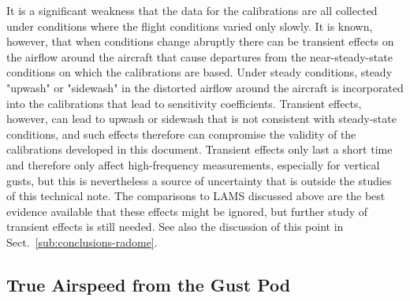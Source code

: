 \documentclass[12pt,twoside,english]{article}\usepackage[]{graphicx}\usepackage[]{color}
\let\OrgIndex\index
\renewcommand*{\index}[1]{\OrgIndex{#1}}
\begin{document}
{{It is a significant weakness that the data for the calibrations are all collected under conditions where the flight conditions varied only slowly. It is known, however, that when conditions change abruptly there can be transient effects on the airflow around the aircraft that cause departures from the near-steady-state conditions on which the calibrations are based. Under steady conditions, steady "upwash" or "sidewash" in the distorted airflow around the aircraft is incorporated into the calibrations that lead to sensitivity coefficients. Transient effects, however, can lead to upwash or sidewash that is not consistent with steady-state conditions, and such effects therefore can compromise the validity of the calibrations developed in this document. Transient effects only last a short time and therefore only affect high-frequency measurements, especially for vertical gusts, but this is nevertheless a source of uncertainty that is outside the studies of this technical note. The comparisons to LAMS discussed above are the best evidence available that these effects might be ignored, but further study of transient effects is still needed. See also the discussion of this point in Sect.\ \ref{sub:conclusions-radome}.

\subsection{True Airspeed from the Gust Pod\label{sub:GP-TAS}}


}}
\end{document}
